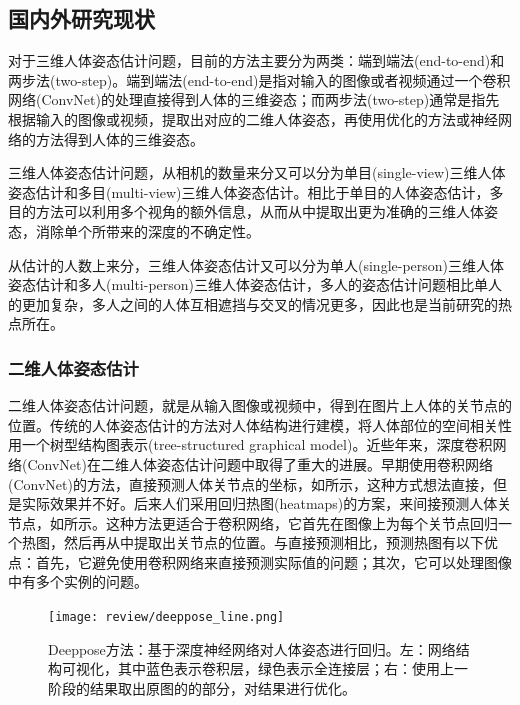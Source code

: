 \subsection{国内外研究现状}

对于三维人体姿态估计问题，目前的方法主要分为两类：端到端法(end-to-end)\autocite{pavlakos2017coarse}和两步法(two-step)\autocite{zhou2016sparseness}。端到端法(end-to-end)\autocite{pavlakos2017coarse}是指对输入的图像或者视频通过一个卷积网络(ConvNet)的处理直接得到人体的三维姿态；而两步法(two-step)\autocite{zhou2016sparseness}通常是指先根据输入的图像或视频，提取出对应的二维人体姿态，再使用优化的方法或神经网络的方法得到人体的三维姿态。

三维人体姿态估计问题，从相机的数量来分又可以分为单目(single-view)三维人体姿态估计和多目(multi-view)三维人体姿态估计。相比于单目的人体姿态估计，多目的方法可以利用多个视角的额外信息，从而从中提取出更为准确的三维人体姿态，消除单个所带来的深度的不确定性。

从估计的人数上来分，三维人体姿态估计又可以分为单人(single-person)三维人体姿态估计和多人(multi-person)三维人体姿态估计，多人的姿态估计问题相比单人的更加复杂，多人之间的人体互相遮挡与交叉的情况更多，因此也是当前研究的热点所在。

\subsubsection{二维人体姿态估计}
二维人体姿态估计问题，就是从输入图像或视频中，得到在图片上人体的关节点的位置。传统的人体姿态估计的方法对人体结构进行建模，将人体部位的空间相关性用一个树型结构图表示(tree-structured graphical model)\autocite{eichner20122d}。近些年来，深度卷积网络(ConvNet)在二维人体姿态估计问题中取得了重大的进展。早期使用卷积网络(ConvNet)的方法，直接预测人体关节点的坐标\autocite{toshev2014deep}，如所示，这种方式想法直接，但是实际效果并不好。后来人们采用回归热图(heatmaps)\autocite{pfister2015flowing}的方案，来间接预测人体关节点，如所示。这种方法更适合于卷积网络，它首先在图像上为每个关节点回归一个热图，然后再从中提取出关节点的位置。与直接预测相比，预测热图有以下优点：首先，它避免使用卷积网络来直接预测实际值的问题；其次，它可以处理图像中有多个实例的问题。
\begin{figure}[ht]
    \texttt{[image: review/deeppose\_line.png]}
    \caption{Deeppose方法\autocite{toshev2014deep}：基于深度神经网络对人体姿态进行回归。左：网络结构可视化，其中蓝色表示卷积层，绿色表示全连接层；右：使用上一阶段的结果取出原图的的部分，对结果进行优化。}\label{fig:deeppose}
\end{figure}

